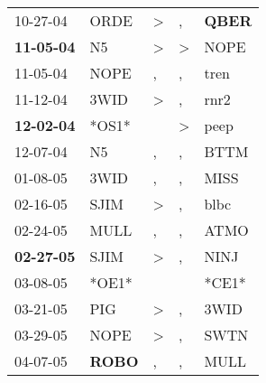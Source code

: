 \begin{supertabular}{p{0.07\textwidth}p{0.06\textwidth}p{0.02\textwidth}p{0.02\textwidth}p{0.06\textwidth}}
          10-27-04\textsuperscript{} &           ORDE\textsuperscript{} &     \textgreater &                , &  \textbf{QBER\textsuperscript{}} \\
 \textbf{11-05-04\textsuperscript{}} &             N5\textsuperscript{} &     \textgreater &     \textgreater &           NOPE\textsuperscript{} \\
          11-05-04\textsuperscript{} &           NOPE\textsuperscript{} &                , &                , &           tren\textsuperscript{} \\
          11-12-04\textsuperscript{} &           3WID\textsuperscript{} &     \textgreater &                , &           rnr2\textsuperscript{} \\
 \textbf{12-02-04\textsuperscript{}} &                            *OS1* &                  &     \textgreater &           peep\textsuperscript{} \\
          12-07-04\textsuperscript{} &             N5\textsuperscript{} &                , &                , &           BTTM\textsuperscript{} \\
          01-08-05\textsuperscript{} &           3WID\textsuperscript{} &                , &                , &           MISS\textsuperscript{} \\
          02-16-05\textsuperscript{} &           SJIM\textsuperscript{} &     \textgreater &                , &           blbc\textsuperscript{} \\
          02-24-05\textsuperscript{} &           MULL\textsuperscript{} &                , &                , &           ATMO\textsuperscript{} \\
 \textbf{02-27-05\textsuperscript{}} &           SJIM\textsuperscript{} &     \textgreater &                , &           NINJ\textsuperscript{} \\
          03-08-05\textsuperscript{} &                            *OE1* &                  &                  &                            *CE1* \\
          03-21-05\textsuperscript{} &            PIG\textsuperscript{} &     \textgreater &                , &           3WID\textsuperscript{} \\
          03-29-05\textsuperscript{} &           NOPE\textsuperscript{} &     \textgreater &                , &           SWTN\textsuperscript{} \\
          04-07-05\textsuperscript{} &  \textbf{ROBO\textsuperscript{}} &                , &                , &           MULL\textsuperscript{} \\

\end{supertabular}
